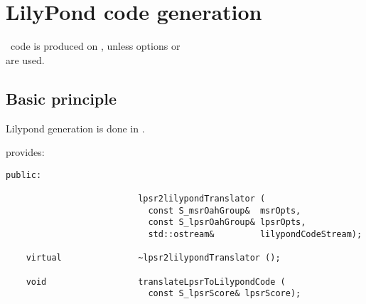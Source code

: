 



\chapter{LilyPond code generation}


\lily\ code is produced on \standardOutput, unless options  or \\
 are used.


\section{Basic principle}

Lilypond generation is done in .

 provides:
\begin{lstlisting}[language=CPlusPlus]
  public:

                          lpsr2lilypondTranslator (
                            const S_msrOahGroup&  msrOpts,
                            const S_lpsrOahGroup& lpsrOpts,
                            std::ostream&         lilypondCodeStream);

    virtual               ~lpsr2lilypondTranslator ();

    void                  translateLpsrToLilypondCode (
                            const S_lpsrScore& lpsrScore);
\end{lstlisting}

